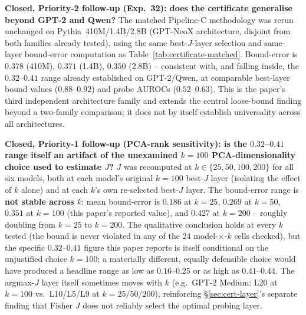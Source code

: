 \documentclass[onecolumn]{jmlr}
\begin{document}
\textbf{Closed, Priority-2 follow-up (Exp.~32): does the certificate
generalise beyond GPT-2 and Qwen?} The matched Pipeline-C methodology
was rerun unchanged on Pythia~410M/1.4B/2.8B (GPT-NeoX architecture,
disjoint from both families already tested), using the same
best-$J$-layer selection and same-layer bound-error computation as
Table~\ref{tab:certificate-matched}. Bound-error is $0.378$ (410M),
$0.371$ (1.4B), $0.350$ (2.8B) -- consistent with, and falling inside,
the $0.32$--$0.41$ range already established on GPT-2/Qwen, at
comparable best-layer bound values ($0.88$--$0.92$) and probe AUROCs
($0.52$--$0.63$). This is the paper's third independent architecture
family and extends the central loose-bound finding beyond a
two-family comparison; it does not by itself establish universality
across all architectures.

\textbf{Closed, Priority-1 follow-up (PCA-rank sensitivity): is
the $0.32$--$0.41$ range itself an artifact of the unexamined
$k{=}100$ PCA-dimensionality choice used to estimate $J$?} $J$ was
recomputed at $k\in\{25,50,100,200\}$ for all six models, both at each
model's original $k{=}100$ best-$J$ layer (isolating the effect of $k$
alone) and at each $k$'s own re-selected best-$J$ layer. The
bound-error range is \textbf{not stable across $k$}: mean bound-error
is $0.186$ at $k{=}25$, $0.269$ at $k{=}50$, $0.351$ at $k{=}100$ (this
paper's reported value), and $0.427$ at $k{=}200$ -- roughly doubling
from $k{=}25$ to $k{=}200$. The qualitative conclusion holds at every
$k$ tested (the bound is never violated in any of the 24 model-$\times$-$k$
cells checked), but the specific $0.32$--$0.41$ figure this paper
reports is itself conditional on the unjustified choice $k{=}100$; a
materially different, equally defensible choice would have produced a
headline range as low as $0.16$--$0.25$ or as high as $0.41$--$0.44$.
The argmax-$J$ layer itself sometimes moves with $k$ (e.g.\ GPT-2
Medium: L20 at $k{=}100$ vs.\ L10/L5/L9 at $k{=}25/50/200$), reinforcing
\S\ref{sec:cert-layer}'s separate finding that Fisher $J$ does not
reliably select the optimal probing layer.
\end{document}
